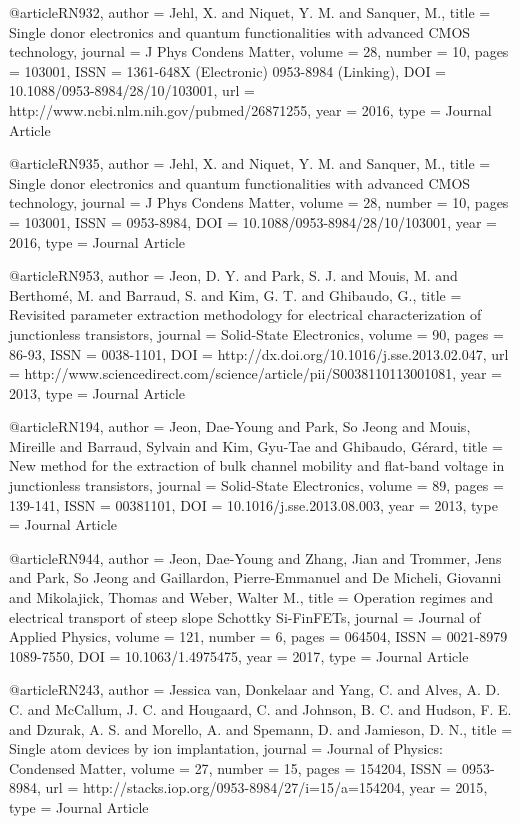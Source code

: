 @article{RN932,
   author = {Jehl, X. and Niquet, Y. M. and Sanquer, M.},
   title = {Single donor electronics and quantum functionalities with advanced CMOS technology},
   journal = {J Phys Condens Matter},
   volume = {28},
   number = {10},
   pages = {103001},
   ISSN = {1361-648X (Electronic)
0953-8984 (Linking)},
   DOI = {10.1088/0953-8984/28/10/103001},
   url = {http://www.ncbi.nlm.nih.gov/pubmed/26871255},
   year = {2016},
   type = {Journal Article}
}

@article{RN935,
   author = {Jehl, X. and Niquet, Y. M. and Sanquer, M.},
   title = {Single donor electronics and quantum functionalities with advanced CMOS technology},
   journal = {J Phys Condens Matter},
   volume = {28},
   number = {10},
   pages = {103001},
   ISSN = {0953-8984},
   DOI = {10.1088/0953-8984/28/10/103001},
   year = {2016},
   type = {Journal Article}
}

@article{RN953,
   author = {Jeon, D. Y. and Park, S. J. and Mouis, M. and Berthomé, M. and Barraud, S. and Kim, G. T. and Ghibaudo, G.},
   title = {Revisited parameter extraction methodology for electrical characterization of junctionless transistors},
   journal = {Solid-State Electronics},
   volume = {90},
   pages = {86-93},
   ISSN = {0038-1101},
   DOI = {http://dx.doi.org/10.1016/j.sse.2013.02.047},
   url = {http://www.sciencedirect.com/science/article/pii/S0038110113001081},
   year = {2013},
   type = {Journal Article}
}

@article{RN194,
   author = {Jeon, Dae-Young and Park, So Jeong and Mouis, Mireille and Barraud, Sylvain and Kim, Gyu-Tae and Ghibaudo, Gérard},
   title = {New method for the extraction of bulk channel mobility and flat-band voltage in junctionless transistors},
   journal = {Solid-State Electronics},
   volume = {89},
   pages = {139-141},
   ISSN = {00381101},
   DOI = {10.1016/j.sse.2013.08.003},
   year = {2013},
   type = {Journal Article}
}

@article{RN944,
   author = {Jeon, Dae-Young and Zhang, Jian and Trommer, Jens and Park, So Jeong and Gaillardon, Pierre-Emmanuel and De Micheli, Giovanni and Mikolajick, Thomas and Weber, Walter M.},
   title = {Operation regimes and electrical transport of steep slope Schottky Si-FinFETs},
   journal = {Journal of Applied Physics},
   volume = {121},
   number = {6},
   pages = {064504},
   ISSN = {0021-8979
1089-7550},
   DOI = {10.1063/1.4975475},
   year = {2017},
   type = {Journal Article}
}

@article{RN243,
   author = {Jessica van, Donkelaar and Yang, C. and Alves, A. D. C. and McCallum, J. C. and Hougaard, C. and Johnson, B. C. and Hudson, F. E. and Dzurak, A. S. and Morello, A. and Spemann, D. and Jamieson, D. N.},
   title = {Single atom devices by ion implantation},
   journal = {Journal of Physics: Condensed Matter},
   volume = {27},
   number = {15},
   pages = {154204},
   ISSN = {0953-8984},
   url = {http://stacks.iop.org/0953-8984/27/i=15/a=154204},
   year = {2015},
   type = {Journal Article}
}

